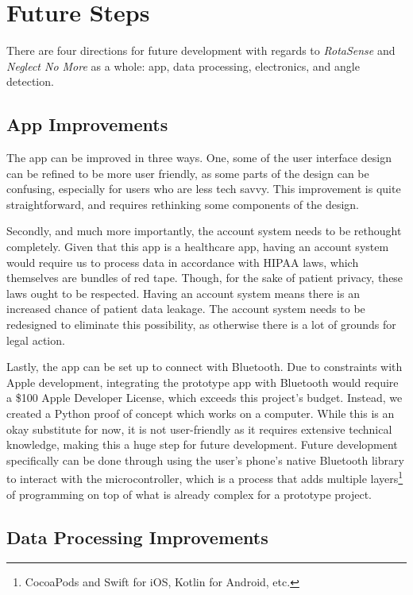 \chapter{Future Steps}
\label{chap:future}

There are four directions for future development with regards to
\textit{RotaSense} and \textit{Neglect No More} as a whole: app, data
processing, electronics, and angle detection.

\section{App Improvements}

The app can be improved in three ways. One, some of the user interface
design can be refined to be more user friendly, as some parts of the design can
be confusing, especially for users who are less tech savvy. This improvement is
quite straightforward, and requires rethinking some components of the design. 

Secondly, and much more importantly, the account system needs to be rethought
completely. Given that this app is a healthcare app, having an account system
would require us to process data in accordance with HIPAA laws, which
themselves are bundles of red tape. Though, for the sake of patient privacy,
these laws ought to be respected. Having an account system means there is an
increased chance of patient data leakage. The account system needs to be
redesigned to eliminate this possibility, as otherwise there is a lot of
grounds for legal action. 

Lastly, the app can be set up to connect with Bluetooth. Due to constraints
with Apple development, integrating the prototype app with Bluetooth would
require a \$100 Apple Developer License, which exceeds this project’s
budget. Instead, we created a Python proof of concept which works on a
computer. While this is an okay substitute for now, it is not user-friendly as
it requires extensive technical knowledge, making this a huge step for future
development. Future development specifically can be done through using the
user’s phone’s native Bluetooth library to interact with the microcontroller,
which is a process that adds multiple
layers\footnote{CocoaPods and Swift for iOS, Kotlin for Android, etc.}
of programming on top of what is already complex for a prototype project.

\section{Data Processing Improvements}

